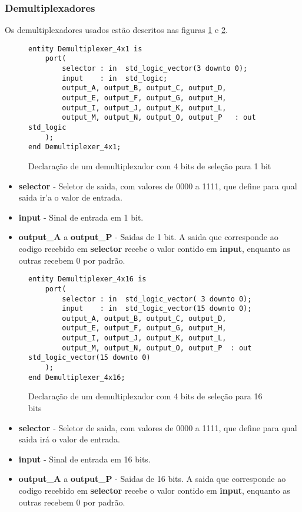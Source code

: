 \documentclass{article}
\newcommand\tab[1][0.50cm]{\hspace*{#1}}
\begin{document}
			\subsubsection[Demultiplexadores]{Demultiplexadores} 
				\tab Os demultiplexadores usados est\~{a}o descritos nas figuras \ref{fig:Demultiplexer_4x1} e \ref{fig:Demultiplexer_4x16}.
				\begin{figure}[H]
					\centering
					\caption[Demultiplexador com 4 bits de sele\c{c}\~{a}o para 1 bit]{Declara\c{c}\~{a}o de um demultiplexador com 4 bits de sele\c{c}\~{a}o para 1 bit}
					\label{fig:Demultiplexer_4x1}
					\begin{lstlisting}[style=vhdl]
entity Demultiplexer_4x1 is
	port(
		selector : in  std_logic_vector(3 downto 0);
		input	 : in  std_logic;
		output_A, output_B, output_C, output_D,
		output_E, output_F, output_G, output_H,
		output_I, output_J, output_K, output_L, 
		output_M, output_N, output_O, output_P   : out std_logic
	);
end Demultiplexer_4x1;
					\end{lstlisting}
				\end{figure}
				\begin{itemize}
					\item \textbf{selector} - Seletor de saida, com valores de 0000 a 1111, que define para qual saida ir'{a} o valor de entrada.
					\item \textbf{input} - Sinal de entrada em 1 bit.
					\item \textbf{output\_A} a \textbf{output\_P} - Saidas de 1 bit. A saida que corresponde ao codigo recebido em \textbf{selector} recebe o valor contido em \textbf{input}, enquanto as outras recebem 0 por padr\~{a}o.
				\end{itemize}
				\begin{figure}[H]
					\centering
					\caption[Demultiplexador com 4 bits de sele\c{c}\~{a}o para 16 bits]{Declara\c{c}\~{a}o de um demultiplexador com 4 bits de sele\c{c}\~{a}o para 16 bits}
					\label{fig:Demultiplexer_4x16}
					\begin{lstlisting}[style=vhdl]
entity Demultiplexer_4x16 is
	port(
		selector : in  std_logic_vector( 3 downto 0);
		input	 : in  std_logic_vector(15 downto 0);
		output_A, output_B, output_C, output_D,
		output_E, output_F, output_G, output_H,
		output_I, output_J, output_K, output_L, 
		output_M, output_N, output_O, output_P	: out std_logic_vector(15 downto 0)
	);
end Demultiplexer_4x16;
					\end{lstlisting}
				\end{figure}
				\begin{itemize}
					\item \textbf{selector} - Seletor de saida, com valores de 0000 a 1111, que define para qual saida ir\'{a} o valor de entrada.
					\item \textbf{input} - Sinal de entrada em 16 bits.
					\item \textbf{output\_A} a \textbf{output\_P} - Saidas de 16 bits. A saida que corresponde ao codigo recebido em \textbf{selector} recebe o valor contido em \textbf{input}, enquanto as outras recebem 0 por padr\~{a}o.
				\end{itemize}
			
\end{document}
